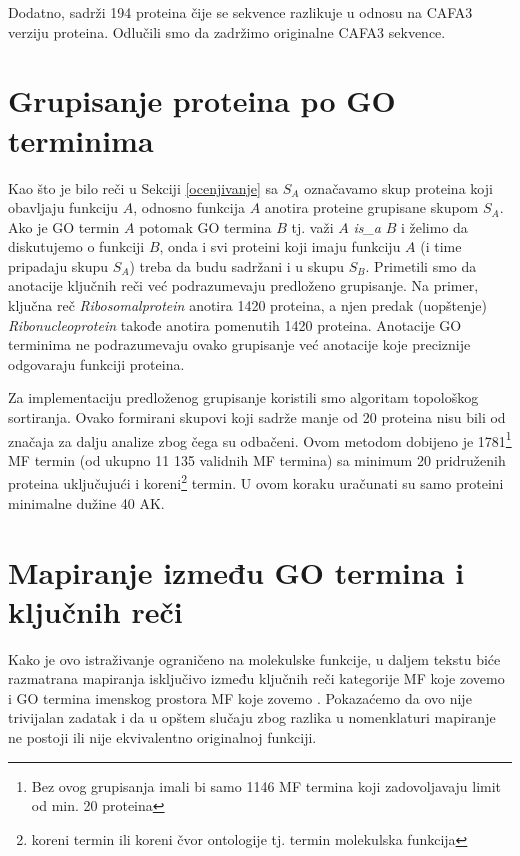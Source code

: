 Dodatno, \swissprot sadrži 194 proteina čije se sekvence razlikuje u
odnosu na CAFA3 verziju proteina. Odlučili smo da zadržimo originalne CAFA3
sekvence.

\section{Grupisanje proteina po GO terminima}
\label{grupisanje}

Kao što je bilo reči u Sekciji \ref{ocenjivanje} sa $S_A$ označavamo skup
proteina koji obavljaju funkciju $A$, odnosno funkcija $A$ anotira proteine
grupisane skupom $S_A$.
Ako je GO termin $A$ potomak GO termina $B$ tj. važi $A$ \textit{is\_a} $B$ i
želimo da diskutujemo o funkciji $B$, onda i svi proteini koji imaju funkciju
$A$ (i time pripadaju skupu $S_A$) treba da budu sadržani i u skupu $S_B$.
Primetili smo da anotacije ključnih reči već podrazumevaju predloženo grupisanje.
Na primer, ključna reč \textit{Ribosomalprotein} anotira 1420 proteina, a
njen predak (uopštenje) \textit{Ribonucleoprotein} takođe anotira pomenutih 1420 proteina.
Anotacije GO terminima ne podrazumevaju ovako grupisanje već anotacije koje
preciznije odgovaraju funkciji proteina. 
 
Za implementaciju predloženog grupisanje koristili smo algoritam topološkog
sortiranja. Ovako formirani skupovi koji sadrže manje od 20 proteina nisu bili
od značaja za dalju analize zbog čega su odbačeni.
Ovom metodom dobijeno je 1781\footnote{Bez ovog grupisanja imali bi samo 1146
MF termina  koji zadovoljavaju limit od min.  20 proteina} MF termin (od ukupno
11 135 validnih MF termina) sa minimum 20 pridruženih proteina uključujući i
koreni\footnote{koreni termin ili koreni čvor ontologije tj.  termin molekulska
funkcija} termin. U ovom koraku uračunati su samo proteini minimalne dužine 40
AK.

\section{Mapiranje između GO termina i \swissprot ključnih reči}
\label{kw2go_mapiranje}

Kako je ovo istraživanje ograničeno na molekulske funkcije, u daljem tekstu biće
razmatrana mapiranja isključivo između ključnih reči kategorije MF koje zovemo
 i GO termina imenskog prostora MF koje zovemo
. Pokazaćemo da ovo nije trivijalan zadatak i da u opštem
slučaju zbog razlika u nomenklaturi mapiranje ne postoji ili nije ekvivalentno
originalnoj funkciji.

